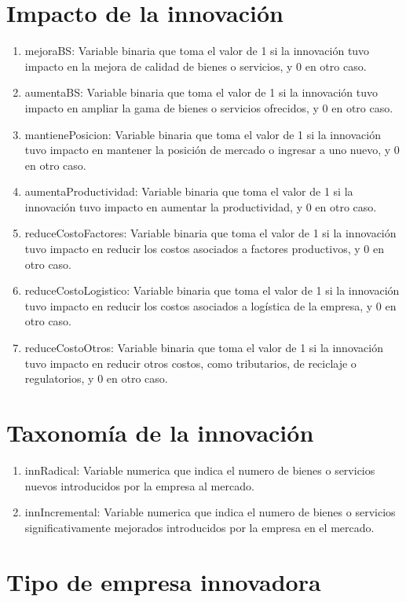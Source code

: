 \documentclass[12pt,a4paper]{article}
\begin{document}
\section{Impacto de la innovación}

\begin{enumerate}
	\item mejoraBS: Variable binaria que toma el valor de 1 si la innovación tuvo impacto en la mejora de calidad de bienes o servicios, y 0 en otro caso.
	\item aumentaBS: Variable binaria que toma el valor de 1 si la innovación tuvo impacto en ampliar la gama de bienes o servicios ofrecidos, y 0 en otro caso.
	\item mantienePosicion: Variable binaria que toma el valor de 1 si la innovación tuvo impacto en mantener la posición de mercado o ingresar a uno nuevo, y 0 en otro caso.
	\item aumentaProductividad: Variable binaria que toma el valor de 1 si la innovación tuvo impacto en aumentar la productividad, y 0 en otro caso.
	\item reduceCostoFactores: Variable binaria que toma el valor de 1 si la innovación tuvo impacto en reducir los costos asociados a factores productivos, y 0 en otro caso.
	\item reduceCostoLogistico: Variable binaria que toma el valor de 1 si la innovación tuvo impacto en reducir los costos asociados a logística de la empresa, y 0 en otro caso.
	\item reduceCostoOtros: Variable binaria que toma el valor de 1 si la innovación tuvo impacto en reducir otros costos, como tributarios, de reciclaje o regulatorios, y 0 en otro caso.
\end{enumerate}

\section{Taxonomía de la innovación}

\begin{enumerate}
	\item innRadical: Variable numerica que indica el numero de bienes o servicios nuevos introducidos por la empresa al mercado.
	\item innIncremental: Variable numerica que indica el numero de bienes o servicios significativamente mejorados introducidos por la empresa en el mercado.
\end{enumerate}

\section{Tipo de empresa innovadora}
\end{document}
